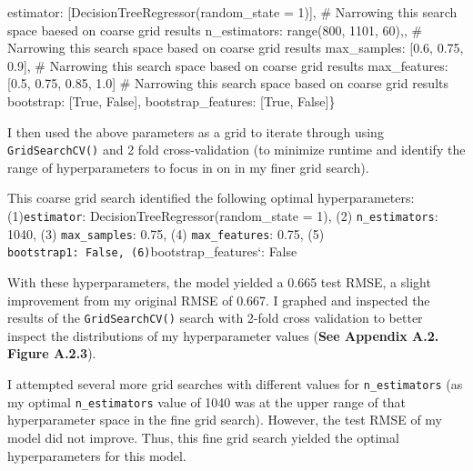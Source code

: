 \documentclass[
  letterpaper,
  DIV=11,
  numbers=noendperiod]{scrartcl}
\newenvironment{Shaded}{\begin{snugshade}}{\end{snugshade}}
\newcommand{\BuiltInTok}[1]{\textcolor[rgb]{0.00,0.23,0.31}{#1}}
\newcommand{\CommentTok}[1]{\textcolor[rgb]{0.37,0.37,0.37}{#1}}
\newcommand{\DecValTok}[1]{\textcolor[rgb]{0.68,0.00,0.00}{#1}}
\newcommand{\FloatTok}[1]{\textcolor[rgb]{0.68,0.00,0.00}{#1}}
\newcommand{\NormalTok}[1]{\textcolor[rgb]{0.00,0.23,0.31}{#1}}
\newcommand{\OperatorTok}[1]{\textcolor[rgb]{0.37,0.37,0.37}{#1}}
\newcommand{\VariableTok}[1]{\textcolor[rgb]{0.07,0.07,0.07}{#1}}
\begin{document}
\begin{Shaded}
\begin{Highlighting}[]
\CommentTok{\textquotesingle{}estimator\textquotesingle{}}\NormalTok{: [DecisionTreeRegressor(random\_state }\OperatorTok{=} \DecValTok{1}\NormalTok{)], }\CommentTok{\# Narrowing this search space baesed on coarse grid results}
\CommentTok{\textquotesingle{}n\_estimators\textquotesingle{}}\NormalTok{: }\BuiltInTok{range}\NormalTok{(}\DecValTok{800}\NormalTok{, }\DecValTok{1101}\NormalTok{, }\DecValTok{60}\NormalTok{),, }\CommentTok{\# Narrowing this search space based on coarse grid results}
\CommentTok{\textquotesingle{}max\_samples\textquotesingle{}}\NormalTok{: [}\FloatTok{0.6}\NormalTok{, }\FloatTok{0.75}\NormalTok{, }\FloatTok{0.9}\NormalTok{], }\CommentTok{\# Narrowing this search space based on coarse grid results}
\CommentTok{\textquotesingle{}max\_features\textquotesingle{}}\NormalTok{: [}\FloatTok{0.5}\NormalTok{, }\FloatTok{0.75}\NormalTok{, }\FloatTok{0.85}\NormalTok{, }\FloatTok{1.0}\NormalTok{] }\CommentTok{\# Narrowing this search space based on coarse grid results}
\CommentTok{\textquotesingle{}bootstrap\textquotesingle{}}\NormalTok{: [}\VariableTok{True}\NormalTok{, }\VariableTok{False}\NormalTok{],}
\CommentTok{\textquotesingle{}bootstrap\_features\textquotesingle{}}\NormalTok{: [}\VariableTok{True}\NormalTok{, }\VariableTok{False}\NormalTok{]\}}
\end{Highlighting}
\end{Shaded}

I then used the above parameters as a grid to iterate through using
\texttt{GridSearchCV()} and 2 fold cross-validation (to minimize runtime
and identify the range of hyperparameters to focus in on in my finer
grid search).

This coarse grid search identified the following optimal
hyperparameters: (1)\texttt{estimator}:
DecisionTreeRegressor(random\_state = 1), (2) \texttt{n\_estimators}:
1040, (3) \texttt{max\_samples}: 0.75, (4) \texttt{max\_features}: 0.75,
(5) \texttt{bootstrap1:\ False,\ (6)}bootstrap\_features`: False

With these hyperparameters, the model yielded a 0.665 test RMSE, a
slight improvement from my original RMSE of 0.667. I graphed and
inspected the results of the \texttt{GridSearchCV()} search with 2-fold
cross validation to better inspect the distributions of my
hyperparameter values (\textbf{See Appendix A.2. Figure A.2.3}).

I attempted several more grid searches with different values for
\texttt{n\_estimators} (as my optimal \texttt{n\_estimators} value of
1040 was at the upper range of that hyperparameter space in the fine
grid search). However, the test RMSE of my model did not improve. Thus,
this fine grid search yielded the optimal hyperparameters for this
model.
\end{document}
